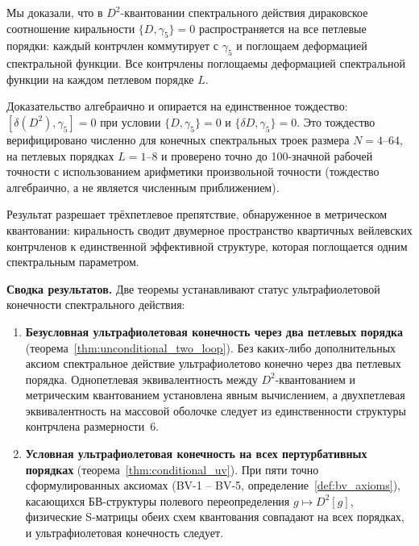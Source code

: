 \documentclass[12pt,a4paper]{article}
\theoremstyle{definition}
\theoremstyle{remark}
\begin{document}
Мы доказали, что в $D^2$-квантовании спектрального действия
дираковское соотношение киральности $\{D, \gamma_5\} = 0$
распространяется на все петлевые порядки: каждый контрчлен коммутирует
с $\gamma_5$ и поглощаем деформацией спектральной функции.  Все
контрчлены поглощаемы деформацией спектральной функции на каждом
петлевом порядке $L$.

Доказательство алгебраично и опирается на единственное тождество:
$[\delta(D^2), \gamma_5] = 0$ при условии $\{D, \gamma_5\} = 0$ и
$\{\delta D, \gamma_5\} = 0$.  Это тождество верифицировано численно
для конечных спектральных троек размера $N = 4$--$64$, на петлевых
порядках $L = 1$--$8$ и проверено точно до 100-значной рабочей
точности с использованием арифметики произвольной точности (тождество
алгебраично, а не является численным приближением).

Результат разрешает трёхпетлевое препятствие, обнаруженное в
метрическом квантовании: киральность сводит двумерное пространство
квартичных вейлевских контрчленов к единственной эффективной структуре,
которая поглощается одним спектральным параметром.

\medskip\noindent
\textbf{Сводка результатов.}
Две теоремы устанавливают статус ультрафиолетовой конечности
спектрального действия:

\begin{enumerate}
  \item \textbf{Безусловная ультрафиолетовая конечность через два
    петлевых порядка}
    (теорема~\ref{thm:unconditional_two_loop}).
    Без каких-либо дополнительных аксиом спектральное действие
    ультрафиолетово конечно через два петлевых порядка.  Однопетлевая
    эквивалентность между $D^2$-квантованием и метрическим
    квантованием установлена явным вычислением, а двухпетлевая
    эквивалентность на массовой оболочке следует из единственности
    структуры контрчлена размерности~$6$.

  \item \textbf{Условная ультрафиолетовая конечность на всех
    пертурбативных порядках}
    (теорема~\ref{thm:conditional_uv}).
    При пяти точно сформулированных аксиомах (BV-1 -- BV-5,
    определение~\ref{def:bv_axioms}), касающихся БВ-структуры полевого
    переопределения $g \mapsto D^2[g]$, физические S-матрицы обеих
    схем квантования совпадают на всех порядках, и ультрафиолетовая
    конечность следует.
\end{enumerate}
\end{document}
